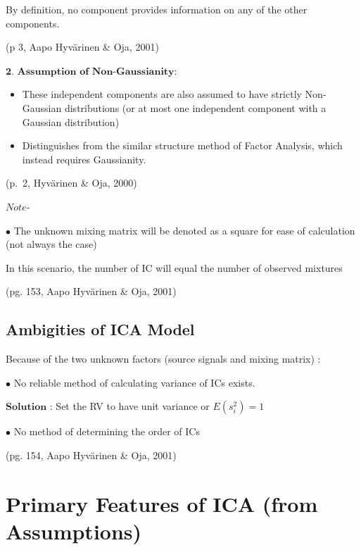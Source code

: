 \documentclass[12pt,twoside]{amherstthesis}
\begin{document}
  By definition, no component provides information on any of the other
  components.
  
  (p 3, Aapo Hyvärinen \& Oja, 2001) \newline
  
  \(\textbf{2. Assumption of Non-Gaussianity}\):
  
  \begin{itemize}
  \item
    These independent components are also assumed to have strictly
    Non-Gaussian distributions (or at most one independent component with
    a Gaussian distribution)
  \item
    Distinguishes from the similar structure method of Factor Analysis,
    which instead requires Gaussianity.
  \end{itemize}
  
  (p.~2, Hyvärinen \& Oja, 2000) \newline
  
  \(\textit{Note}\)-
  
  \(\bullet\) The unknown mixing matrix will be denoted as a square for
  ease of calculation (not always the case) \newline
  
  In this scenario, the number of IC will equal the number of observed
  mixtures
  
  (pg. 153, Aapo Hyvärinen \& Oja, 2001)
  
  \subsection{Ambigities of ICA Model}\label{ambigities-of-ica-model}
  
  Because of the two unknown factors (source signals and mixing matrix) :
  
  \(\bullet\) No reliable method of calculating variance of ICs exists.
  
  \(\textbf{Solution}\) : Set the RV to have unit variance or
  \(E(s_i^2) = 1\) \newline
  
  \(\bullet\) No method of determining the order of ICs
  
  (pg. 154, Aapo Hyvärinen \& Oja, 2001)
  
  \section{Primary Features of ICA (from
  Assumptions)}\label{primary-features-of-ica-from-assumptions}
  
\end{document}
